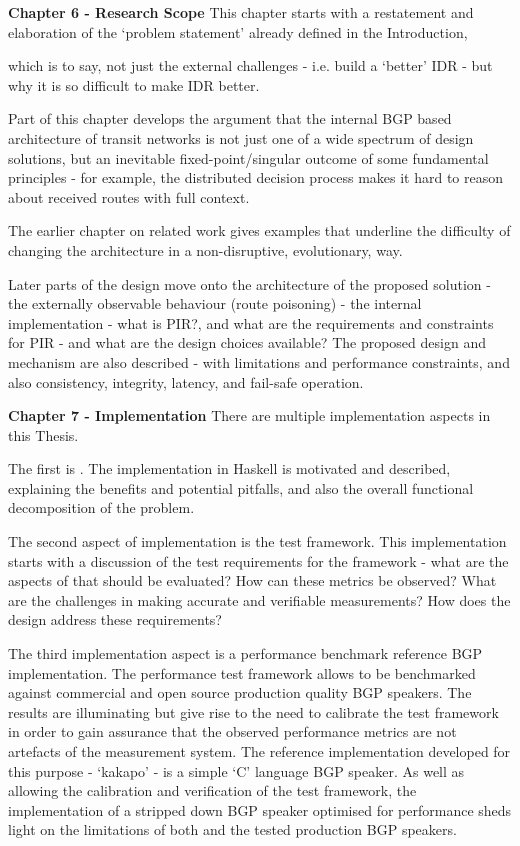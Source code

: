 
\bigskip

\textbf{Chapter 6 - Research Scope}
This chapter starts with a restatement and elaboration of the ‘problem statement’ already defined in the Introduction,

 which is to say, not just the external challenges - i.e. build a ‘better’ IDR - but why it is so difficult to make IDR better.

 Part of this chapter develops the argument that the internal BGP based architecture of transit networks is not just one of a wide spectrum of design solutions, but an inevitable fixed-point/singular outcome of some fundamental principles - for example, the distributed decision process makes it hard to reason about received routes with full context.

 The earlier chapter on related work gives examples that underline the difficulty of changing the architecture in a non-disruptive, evolutionary, way.

Later parts of the design move onto the architecture of the proposed solution - the externally observable behaviour (route poisoning) - the internal implementation - what is PIR?, and what are the requirements and constraints for PIR - and what are the design choices available?
The proposed design and mechanism are also described - with limitations and performance constraints, and also consistency, integrity, latency, and fail-safe operation.
\medskip

\textbf{Chapter 7 - Implementation}
There are multiple implementation aspects in this Thesis.

The first is \hbgp.
The implementation in Haskell is motivated and described, explaining the benefits and potential pitfalls, and also the overall functional decomposition of the problem.

The second aspect of implementation is the test framework.
This implementation starts with a discussion of the test requirements for the framework - what are the aspects of \hbgp that should be evaluated?
How can these metrics be observed? What are the challenges in making accurate and verifiable measurements?
How does the design address these requirements?

The third implementation aspect is a performance benchmark reference BGP implementation.
The performance test framework allows \hbgp to be benchmarked against commercial and open source production quality BGP speakers.
The results are illuminating but give rise to the need to calibrate the test framework in order to gain assurance that the observed performance metrics are not artefacts of the measurement system.
The reference implementation developed for this purpose - `kakapo' - is a simple `C’ language BGP speaker.
As well as allowing the calibration and verification of the test framework, the implementation of a stripped down BGP speaker optimised for performance sheds light on the limitations of both \hbgp and the tested production BGP speakers.
\medskip

